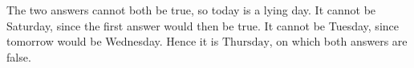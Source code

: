 The two answers cannot both be true, so today is a lying day. It cannot be Saturday, since the first answer would then be true. It cannot be Tuesday, since tomorrow would be Wednesday. Hence it is $\boxed{\text{Thursday}}$, on which both answers are false.
